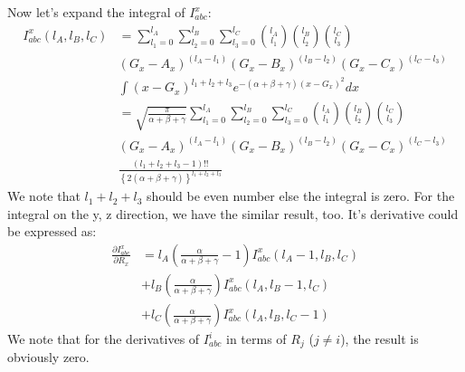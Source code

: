 Now let's expand the integral of $I^{x}_{abc}$:
\begin{equation}
 \begin{split}
  I^{x}_{abc}(l_{A},l_{B},l_{C}) &= \sum_{l_{1}=0}^{l_{A}}\sum_{l_{2}=0}^{l_{B}}
\sum_{l_{3}=0}^{l_{C}}  
\binom{l_{A}}{l_{1}}\binom{l_{B}}{l_{2}}\binom{l_{C}}{l_{3}} \\
&(G_{x}-A_{x})^{(l_{A}-l_{1})} 
 (G_{x}-B_{x})^{(l_{B}-l_{2})}
 (G_{x}-C_{x})^{(l_{C}-l_{3})} \\
&\int (x-G_{x})^{l_{1}+l_{2}+l_{3}}
e^{-(\alpha+\beta+\gamma)(x-G_{x})^{2}} dx \\
&= \sqrt{\frac{\pi}{\alpha+\beta+\gamma}}\sum_{l_{1}=0}^{l_{A}}\sum_{l_{2}=0}^{l_{B}}
\sum_{l_{3}=0}^{l_{C}}  
\binom{l_{A}}{l_{1}}\binom{l_{B}}{l_{2}}\binom{l_{C}}{l_{3}} \\
&(G_{x}-A_{x})^{(l_{A}-l_{1})} 
 (G_{x}-B_{x})^{(l_{B}-l_{2})}
 (G_{x}-C_{x})^{(l_{C}-l_{3})} \\
&\frac{(l_{1}+l_{2}+l_{3}-1)!!}
{\left\lbrace 2(\alpha+\beta+\gamma)\right\rbrace^{l_{1}+l_{2}+l_{3}} }
 \end{split}
\label{OS_three_overlap_int_eq:10}
\end{equation}
We note that $l_{1}+l_{2}+l_{3}$ should be even number else the integral is zero. For
the integral on the y, z direction, we have the similar result, too.
It's derivative could be expressed as:
\begin{equation}
\begin{split}
 \frac{\partial I^{x}_{abc}}{\partial R_{x}} &= 
l_{A}\left( \frac{\alpha}{\alpha+\beta+\gamma} -1\right)I^{x}_{abc}(l_{A}-1,l_{B},l_{C}) \\
&+ l_{B}\left( \frac{\alpha}{\alpha+\beta+\gamma}\right)I^{x}_{abc}(l_{A},l_{B}-1,l_{C}) \\
&+ l_{C}\left( \frac{\alpha}{\alpha+\beta+\gamma}\right)I^{x}_{abc}(l_{A},l_{B},l_{C}-1) 
\end{split}
 \label{OS_three_overlap_int_eq:11}
\end{equation}
We note that for the derivatives of $I^{i}_{abc}$ in terms of $R_{j}$ ($j \neq i$), the result
is obviously zero. 


